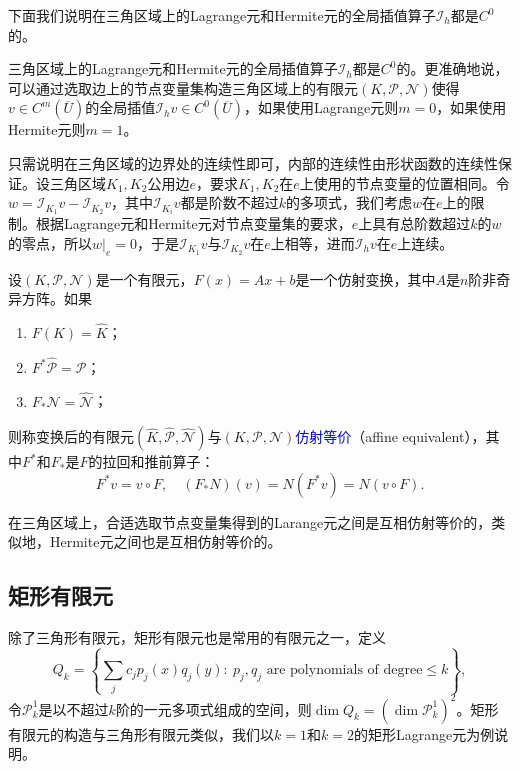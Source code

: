 \documentclass[a4paper,10pt]{ctexart}
\begin{document}
下面我们说明在三角区域上的Lagrange元和Hermite元的全局插值算子$ \mathcal{I}_h $都是$ C^0 $的。

\begin{theorem}
    三角区域上的Lagrange元和Hermite元的全局插值算子$ \mathcal{I}_h $都是$ C^0 $的。更准确地说，可以通过选取边上的节点变量集构造三角区域上的有限元$ (K,\mathcal{P},\mathcal{N}) $使得$ v\in C^m(\overline{U}) $的全局插值$ \mathcal{I}_h v\in C^0(\overline{U}) $，如果使用Lagrange元则$ m=0 $，如果使用Hermite元则$ m=1 $。
\end{theorem}
\noindent 只需说明在三角区域的边界处的连续性即可，内部的连续性由形状函数的连续性保证。设三角区域$ K_1,K_2 $公用边$ e $，要求$ K_1,K_2 $在$ e $上使用的节点变量的位置相同。令$ w = \mathcal{I}_{K_1}v - \mathcal{I}_{K_2}v $，其中$ \mathcal{I}_{K_i}v $都是阶数不超过$ k $的多项式，我们考虑$ w $在$ e $上的限制。根据Lagrange元和Hermite元对节点变量集的要求，$ e $上具有总阶数超过$ k $的$ w $的零点，所以$ w|_e = 0 $，于是$ \mathcal{I}_{K_1}v $与$ \mathcal{I}_{K_2}v $在$ e $上相等，进而$ \mathcal{I}_h v $在$ e $上连续。

\begin{definition}
    设$ (K,\mathcal{P},\mathcal{N}) $是一个有限元，$ F(x) = Ax+b $是一个仿射变换，其中$ A $是$ n $阶非奇异方阵。如果
    \begin{enumerate}
        \item $ F(K) = \hat{K} $；
        \item $ F^*\hat{\mathcal{P}} = \mathcal{P} $；
        \item $ F_* \mathcal{N} = \hat{\mathcal{N}} $；
    \end{enumerate}
    则称变换后的有限元$ (\hat{K},\hat{\mathcal{P}},\hat{\mathcal{N}}) $与$ (K,\mathcal{P},\mathcal{N}) $\textcolor{blue}{仿射等价}（affine equivalent），其中$ F^* $和$ F_* $是$ F $的拉回和推前算子：
    \begin{equation}
        F^*v = v\circ F,\quad (F_*N)(v) = N(F^*v) = N(v\circ F).
    \end{equation}
\end{definition}
在三角区域上，合适选取节点变量集得到的Larange元之间是互相仿射等价的，类似地，Hermite元之间也是互相仿射等价的。

\subsection{矩形有限元}
除了三角形有限元，矩形有限元也是常用的有限元之一，定义
\begin{equation}
    Q_k = \left\{ \sum_{j}c_j p_j(x)q_j(y):\ p_j , q_j \text{ are polynomials of degree} \leqslant k \right\},
\end{equation}
令$ \mathcal{P}_k^1 $是以不超过$ k $阶的一元多项式组成的空间，则$ \dim Q_k = (\dim \mathcal{P}_k^1)^2 $。矩形有限元的构造与三角形有限元类似，我们以$ k=1 $和$ k=2 $的矩形Lagrange元为例说明。
\end{document}
